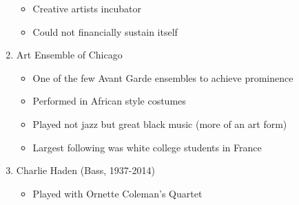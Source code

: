\documentclass[]{article}
\providecommand{\tightlist}{%
  \setlength{\itemsep}{0pt}\setlength{\parskip}{0pt}}
\begin{document}
\begin{enumerate}
  \begin{itemize}
  \tightlist
  \item
    Creative artists incubator
  \item
    Could not financially sustain itself
  \end{itemize}
\item
  Art Ensemble of Chicago

  \begin{itemize}
  \tightlist
  \item
    One of the few Avant Garde ensembles to achieve prominence
  \item
    Performed in African style costumes
  \item
    Played not jazz but great black music (more of an art form)
  \item
    Largest following was white college students in France
  \end{itemize}
\item
  Charlie Haden (Bass, 1937-2014)

  \begin{itemize}
  \tightlist
  \item
    Played with Ornette Coleman's Quartet
  \end{itemize}
\end{enumerate}
\end{document}
